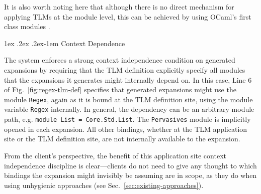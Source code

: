 \documentclass[acmsmall,screen]{acmart}
\makeatletter
\renewcommand{\subsubsection}{%
  \@startsection{subsubsection}{3}%
  {\z@}{1ex \@plus .2ex \@minus .2ex}{-1em}%
  {\sffamily\normalsize\itshape\maybe@addperiod}%
}
\newcommand{\maybe@addperiod}[1]{%
  #1\@addpunct{.}%
}
\newcommand{\li}[1]{\lstinline[basicstyle=\ttfamily\fontsize{9pt}{1em}\selectfont]{#1}}
\makeatother
\begin{document}
It is also worth noting here that although there is no direct mechanism for applying TLMs at the module level, this can be achieved by using OCaml's first class modules \cite{ocaml-manual}.

\subsubsection{Context Dependence}
\label{sec:context-dependence}


The system enforces a strong context independence condition on generated expansions by requiring that the TLM definition explicitly specify all modules that the expansions it generates might internally depend on. In this case, Line 6 of Fig.~\ref{fig:regex-tlm-def} specifies that generated expansions might use the module \li{Regex}, again as it is bound at the TLM definition site, using the module variable \li{Regex} internally. In  general, the dependency can be an arbitrary module path, e.g. \li{module List = Core.Std.List}. The \li{Pervasives} module is implicitly opened in each expansion. All other bindings, whether at the TLM application site or the TLM definition site, are not internally available to the expansion. 



From the client's perspective, the benefit of this application site context independence discipline is clear---clients do not need to give any thought to which bindings the expansion might invisibly be assuming are in scope, as they do when using unhygienic approaches (see Sec.~\ref{sec:existing-approaches}).%
\end{document}
